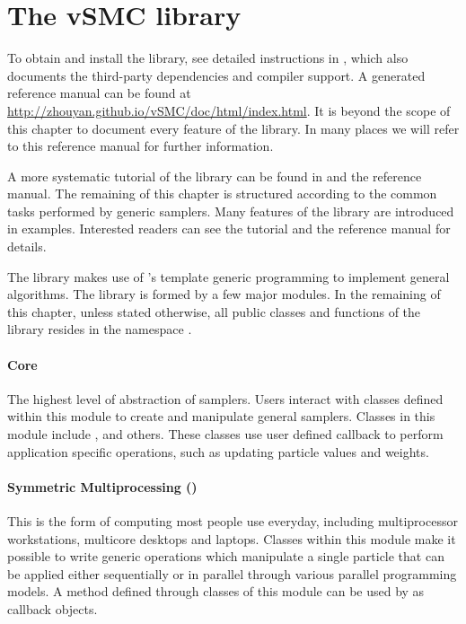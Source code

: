 \section{The vSMC library}
\label{sec:The vSMC library}

To obtain and install the library, see detailed instructions in
\cite{vsmcjss}, which also documents the third-party dependencies and compiler
support. A \doxygen \cite{doxygen} generated reference manual can be found at
\url{http://zhouyan.github.io/vSMC/doc/html/index.html}. It is beyond the
scope of this chapter to document every feature of the \vsmc library. In many
places we will refer to this reference manual for further information.

A more systematic tutorial of the library can be found in \cite{vsmcjss} and
the reference manual. The remaining of this chapter is structured according to
the common tasks performed by generic \smc samplers. Many features of the
library are introduced in examples. Interested readers can see the tutorial
\cite{vsmcjss} and the reference manual for details.

The \vsmc library makes use of \cpp's template generic programming to
implement general \smc algorithms. The library is formed by a few major
modules. In the remaining of this chapter, unless stated otherwise, all public
classes and functions of the library resides in the namespace
.

\paragraph{Core}

The highest level of abstraction of \smc samplers. Users interact with classes
defined within this module to create and manipulate general \smc samplers.
Classes in this module include ,  and
others. These classes use user defined callback to perform application
specific operations, such as updating particle values and weights.

\paragraph{Symmetric Multiprocessing (\smp)}

This is the form of computing most people use everyday, including
multiprocessor workstations, multicore desktops and laptops. Classes within
this module make it possible to write generic operations which manipulate a
single particle that can be applied either sequentially or in parallel through
various parallel programming models. A method defined through classes of this
module can be used by  as callback objects.

